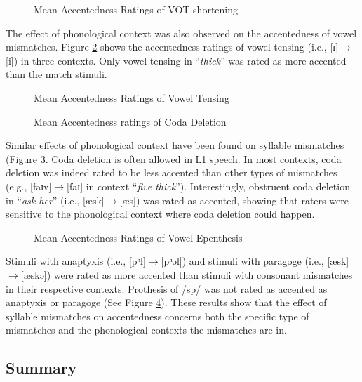 \begin{figure}[!h]
  \figSpace
\centering

\caption{Mean Accentedness Ratings of VOT shortening}
\label{fig:vot}
\figSpace
\end{figure}

The effect of phonological context was also observed on the accentedness of vowel mismatches. Figure \ref{fig:tense} shows the accentedness ratings of vowel tensing (i.e., [ɪ]$\rightarrow$[i]) in three contexts. Only vowel tensing in “\textit{thick}” was rated as more accented than the match stimuli. 

\begin{figure}[!h]
  \figSpace
\centering

\caption{Mean Accentedness Ratings of Vowel Tensing}
\label{fig:tense}
\figSpace
\end{figure}

\begin{figure}[!h]
  \figSpace
\centering

\caption{Mean Accentedness ratings of Coda Deletion}
\label{fig:cdel}
\figSpace
\end{figure}

Similar effects of phonological context have been found on syllable mismatches (Figure \ref{fig:cdel}. Coda deletion is often allowed in L1 speech. In most contexts, coda deletion was indeed rated to be less accented than other types of mismatches (e.g., [faɪv]$\rightarrow$[faɪ] in context “\textit{five thick}”). Interestingly, obstruent coda deletion in “\textit{ask her}” (i.e., [æsk]$\rightarrow$[æs]) was rated as accented, showing that raters were sensitive to the phonological context where coda deletion could happen. 

\begin{figure}[!h]
  \figSpace
\centering

\caption{Mean Accentedness Ratings of Vowel Epenthesis}
\label{fig:epe1}
\figSpace
\end{figure}

Stimuli with anaptyxis (i.e., [pʰl]$\rightarrow$[pʰəl]) and stimuli with paragoge (i.e., [æsk]$\rightarrow$[æskə]) were rated as more accented than stimuli with consonant mismatches in their respective contexts. Prothesis of /sp/ was not rated as accented as anaptyxis or paragoge (See Figure \ref{fig:epe1}). These results show that the effect of syllable mismatches on accentedness concerns both the specific type of mismatches and the phonological contexts the mismatches are in. 

\subsection{Summary}

